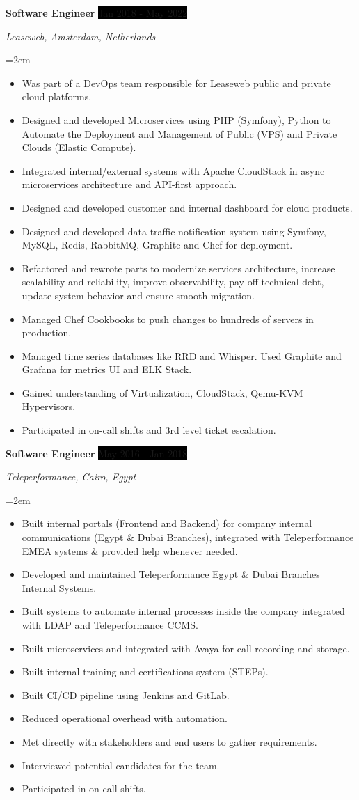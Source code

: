 \documentclass[paper=a4,fontsize=11pt]{scrartcl} %
\newcommand{\sepspace}{\vspace*{1em}}		%
\newcommand{\EducationEntry}[4]{
		\noindent \textbf{#1} \hfill      %
		\colorbox{Black}{%
			\parbox{6em}{%
			\hfill\color{White}#2}} \par  %
		\noindent \textit{#3} \par        %
		\noindent\hangindent=2em\hangafter=0 \small #4 %
		\normalsize \par}
\newcommand{\WorkEntry}[4]{				  %
		\noindent \textbf{#1} \hfill      %
		\colorbox{Black}{\color{White}#2} \par  %
		\noindent \textit{#3} \par              %
		\noindent\hangindent=2em\hangafter=0 \small #4 %
		\normalsize \par}
\begin{document}
\WorkEntry{Software Engineer}{Jan 2018 - May 2022}{Leaseweb, Amsterdam, Netherlands}{\begin{itemize}
\item Was part of a DevOps team responsible for Leaseweb public and private cloud platforms.
\item Designed and developed Microservices using PHP (Symfony), Python to Automate the Deployment and Management of Public (VPS) and Private Clouds (Elastic Compute).
\item Integrated internal/external systems with Apache CloudStack in async microservices architecture and API-first approach.
\item Designed and developed customer and internal dashboard for cloud products.
\item Designed and developed data traffic notification system using Symfony, MySQL, Redis, RabbitMQ, Graphite and Chef for deployment.
\item Refactored and rewrote parts to modernize services architecture, increase scalability and reliability, improve observability, pay off technical debt, update system behavior and ensure smooth migration.
\item Managed Chef Cookbooks to push changes to hundreds of servers in production.
\item Managed time series databases like RRD and Whisper. Used Graphite and Grafana for metrics UI and ELK Stack.
\item Gained understanding of Virtualization, CloudStack, Qemu-KVM Hypervisors.
\item Participated in on-call shifts and 3rd level ticket escalation.
\end{itemize}}
\sepspace

\WorkEntry{Software Engineer}{May 2016 - Jan 2018}{Teleperformance, Cairo, Egypt}{\begin{itemize}
\item Built internal portals (Frontend and Backend) for company internal communications (Egypt \& Dubai Branches), integrated with Teleperformance EMEA systems \& provided help whenever needed.
\item Developed and maintained Teleperformance Egypt \& Dubai Branches Internal Systems.
\item Built systems to automate internal processes inside the company integrated with LDAP and Teleperformance CCMS.
\item Built microservices and integrated with Avaya for call recording and storage.
\item Built internal training and certifications system (STEPs).
\item Built CI/CD pipeline using Jenkins and GitLab.
\item Reduced operational overhead with automation.
\item Met directly with stakeholders and end users to gather requirements.
\item Interviewed potential candidates for the team.
\item Participated in on-call shifts.
\end{itemize}}
\sepspace
\end{document}
